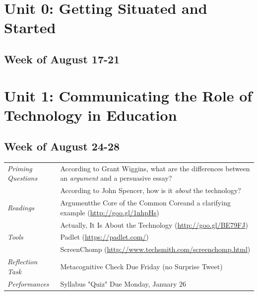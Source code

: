 \documentclass{tufte-handout}
\newcommand{\tabpq}{\faQuestionSign\medspace\textit{Priming Questions}}
\newcommand{\tabread}{\faBook\medspace\textit{Readings}}
\newcommand{\tabtools}{\faWrench\medspace\textit{Tools}}
\newcommand{\tabtweet}{\faLightbulb\medspace\textit{Reflection Task} & Surprise Tweet Due Friday \\}
\newcommand{\tabcheck}{\faLightbulb\medspace\textit{Reflection Task} & Metacognitive Check Due Friday (no Surprise Tweet) \\}
\newcommand{\tabperformance}{\faTasks\medspace\textit{Performances}}
\newenvironment{tabsched}
	{\small
	\begin{tabular}{p{1.5in}p{5in}}
	\toprule}
	{\bottomrule
	\end{tabular}
	\normalsize}
\newcommand{\weekone}{August 17-21}
\newcommand{\weektwo}{August 24-28}
\begin{document}
\begin{fullwidth}

\section{Unit 0: Getting Situated and Started}

\subsection{Week of \weekone}


\section{Unit 1: Communicating the Role of Technology in Education}

\subsection{Week of \weektwo}

\begin{tabsched}
	\tabpq & According to Grant Wiggins, what are the differences between an \emph{argument} and a persuasive essay? \\
	& According to John Spencer, how is it \emph{about} the technology? \\
	\midrule
	\tabread & Argument\textemdash{}the Core of the Common Core\textemdash{}and a clarifying example (\url{http://goo.gl/1nhpHs}) \\
	& Actually, It Is About the Technology (\url{http://goo.gl/BE79FJ}) \\
	\midrule
	\tabtools & Padlet (\url{https://padlet.com/}) \\
	& ScreenChomp (\url{http://www.techsmith.com/screenchomp.html}) \\
	\midrule
	\tabcheck
	\midrule
	\tabperformance & Syllabus "Quiz" Due Monday, January 26 \\
\end{tabsched}


\end{fullwidth}
\end{document}
